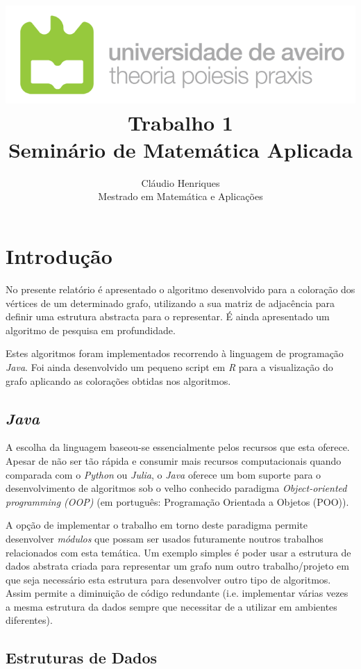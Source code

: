 \documentclass[a4paper,12pt]{report}
\title{
    \protect\includegraphics[scale=0.8]{img/ua.png}\\
    [4cm]Trabalho 1\\
    Seminário de Matemática Aplicada
}
\author{
    Cláudio Henriques\\
    Mestrado em Matemática e Aplicações
}
\begin{document}
\maketitle
\tableofcontents
\listoffigures

\chapter{Introdução}

No presente relatório é apresentado o algoritmo desenvolvido para a coloração dos vértices de um determinado grafo, utilizando a sua matriz de adjacência para definir uma estrutura abstracta para o representar. É ainda apresentado um algoritmo de pesquisa em profundidade.

Estes algoritmos foram implementados recorrendo à linguagem de programação \textit{Java}. Foi ainda desenvolvido um pequeno script em \textit{R} para a visualização do grafo aplicando as colorações obtidas nos algoritmos.

\section{\textit{Java}}

A escolha da linguagem baseou-se essencialmente pelos recursos que esta oferece. Apesar de não ser tão rápida e consumir mais recursos computacionais quando comparada com o \textit{Python} ou \textit{Julia}, o \textit{Java} oferece um bom suporte para o desenvolvimento de algoritmos sob o velho conhecido paradigma \textit{Object-oriented programming (OOP)} (em português: Programação Orientada a Objetos (POO)).

A opção de implementar o trabalho em torno deste paradigma permite desenvolver \textit{módulos} que possam ser usados futuramente noutros trabalhos relacionados com esta temática. Um exemplo simples é poder usar a estrutura de dados abstrata criada para representar um grafo num outro trabalho/projeto em que seja necessário esta estrutura para desenvolver outro tipo de algoritmos. Assim permite a diminuição de código redundante (i.e. implementar várias vezes a mesma estrutura da dados sempre que necessitar de a utilizar em ambientes diferentes).

\section{Estruturas de Dados}
\end{document}
